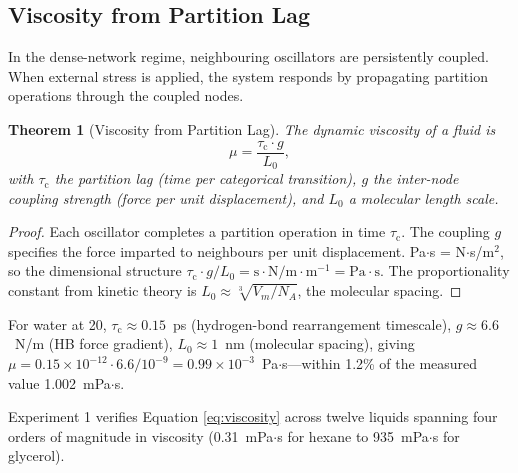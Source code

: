 \documentclass[twocolumn,10pt,a4paper]{article}
\newtheorem{theorem}{Theorem}[section]
\theoremstyle{definition}
\theoremstyle{remark}
\newcommand{\tauC}{\tau_{\mathrm{c}}}
\begin{document}
\subsection{Viscosity from Partition Lag}

In the dense-network regime, neighbouring oscillators are persistently coupled. When external stress is applied, the system responds by propagating partition operations through the coupled nodes.

\begin{theorem}[Viscosity from Partition Lag]
\label{thm:viscosity}
The dynamic viscosity of a fluid is
\begin{equation}
\mu = \frac{\tauC \cdot g}{L_0},
\label{eq:viscosity}
\end{equation}
with $\tauC$ the partition lag (time per categorical transition), $g$ the inter-node coupling strength (force per unit displacement), and $L_0$ a molecular length scale.
\end{theorem}

\begin{proof}
Each oscillator completes a partition operation in time $\tauC$. The coupling $g$ specifies the force imparted to neighbours per unit displacement. Pa$\cdot$s = N$\cdot$s/m$^2$, so the dimensional structure $\tauC \cdot g / L_0 = \mathrm{s} \cdot \mathrm{N/m} \cdot \mathrm{m}^{-1} = \mathrm{Pa\cdot s}$. The proportionality constant from kinetic theory \citep{chapman1990} is $L_0 \approx \sqrt[3]{V_m/N_A}$, the molecular spacing.
\end{proof}

For water at 20\textcelsius, $\tauC \approx 0.15$~ps (hydrogen-bond rearrangement timescale), $g \approx 6.6$~N/m (HB force gradient), $L_0 \approx 1$~nm (molecular spacing), giving $\mu = 0.15\times10^{-12} \cdot 6.6 / 10^{-9} = 0.99\times10^{-3}$~Pa$\cdot$s---within 1.2\% of the measured value 1.002~mPa$\cdot$s.

Experiment 1 verifies Equation \eqref{eq:viscosity} across twelve liquids spanning four orders of magnitude in viscosity (0.31~mPa$\cdot$s for hexane to 935~mPa$\cdot$s for glycerol).
\end{document}
